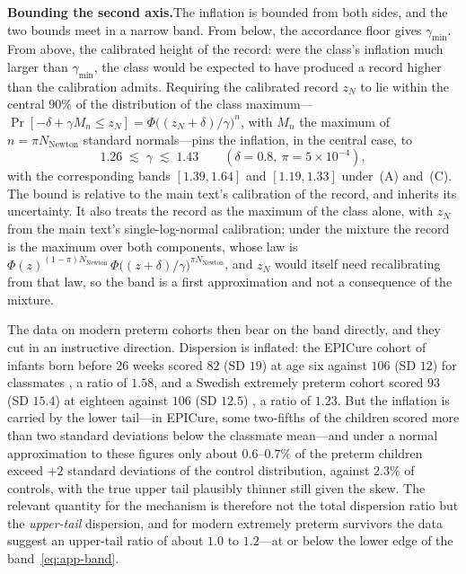 \documentclass{article}
\begin{document}
\par\medskip\noindent\textbf{Bounding the second axis.}\enspace The inflation is bounded from both sides, and the two bounds meet in a narrow band. From below, the accordance floor gives $\gamma_{\min}$. From above, the calibrated height of the record: were the class's inflation much larger than $\gamma_{\min}$, the class would be expected to have produced a record higher than the calibration admits. Requiring the calibrated record $z_N$ to lie within the central $90\%$ of the distribution of the class maximum---$\Pr[-\delta + \gamma M_n \leq z_N] = \Phi\bigl((z_N+\delta)/\gamma\bigr)^{n}$, with $M_n$ the maximum of $n = \pi N_{\mathrm{Newton}}$ standard normals---pins the inflation, in the central case, to
\begin{equation}\label{eq:app-band}
  1.26 \;\lesssim\; \gamma \;\lesssim\; 1.43 \qquad (\delta = 0.8,\ \pi = 5 \times 10^{-4}),
\end{equation}
with the corresponding bands $[1.39, 1.64]$ and $[1.19, 1.33]$ under~(A) and~(C). The bound is relative to the main text's calibration of the record, and inherits its uncertainty. It also treats the record as the maximum of the class alone, with $z_N$ from the main text's single-log-normal calibration; under the mixture the record is the maximum over both components, whose law is $\Phi(z)^{(1-\pi)N_{\mathrm{Newton}}}\,\Phi\bigl((z+\delta)/\gamma\bigr)^{\pi N_{\mathrm{Newton}}}$, and $z_N$ would itself need recalibrating from that law, so the band is a first approximation and not a consequence of the mixture.

The data on modern preterm cohorts then bear on the band directly, and they cut in an instructive direction. Dispersion is inflated: the EPICure cohort of infants born before $26$ weeks scored $82$ (SD $19$) at age six against $106$ (SD $12$) for classmates \cite{marlow2005neurologic}, a ratio of $1.58$, and a Swedish extremely preterm cohort scored $93$ (SD $15.4$) at eighteen against $106$ (SD $12.5$) \cite{hallin2010followup}, a ratio of $1.23$. But the inflation is carried by the lower tail---in EPICure, some two-fifths of the children scored more than two standard deviations below the classmate mean---and under a normal approximation to these figures only about $0.6$--$0.7\%$ of the preterm children exceed $+2$ standard deviations of the control distribution, against $2.3\%$ of controls, with the true upper tail plausibly thinner still given the skew. The relevant quantity for the mechanism is therefore not the total dispersion ratio but the \emph{upper-tail} dispersion, and for modern extremely preterm survivors the data suggest an upper-tail ratio of about $1.0$ to $1.2$---at or below the lower edge of the band~\eqref{eq:app-band}.
\end{document}
